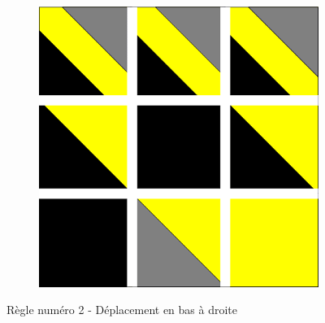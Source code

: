\documentclass[a4paper]{article}
\begin{document}
\begin{figure}[!h]
\begin{subfigure}[t]{0.17\textwidth}
    \end{subfigure}
    \hfill
    \begin{subfigure}[t]{0.17\textwidth}
        \includegraphics[width=\textwidth]{img/rule22.png}
    \end{subfigure}
    \caption{Règle numéro 2 - Déplacement en bas à droite}
\end{figure}
\end{document}
